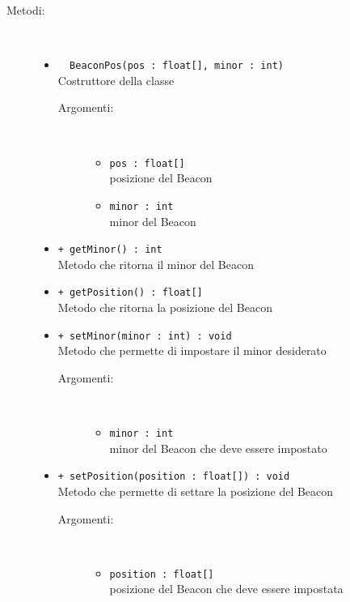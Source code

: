 \documentclass[../DefinizioneDiProdotto.tex]{subfiles}
\begin{document}
\begin{description}
\begin{itemize}
	\end{itemize}
	\item[Metodi:] \
	\begin{itemize}
		\item \texttt{~ BeaconPos(pos : float[], minor : int)}\\
		Costruttore della classe
		\begin{description}
			\item[Argomenti:] \
			\begin{itemize}
				\item \texttt{pos : float[]}\\
				posizione del Beacon\item \texttt{minor : int}\\
				minor del Beacon\end{itemize}
		\end{description}
		\item \texttt{+ getMinor() : int}\\
		Metodo che ritorna il minor del Beacon
		\item \texttt{+ getPosition() : float[]}\\
		Metodo che ritorna la posizione del Beacon
		\item \texttt{+ setMinor(minor : int) : void}\\
		Metodo che permette di impostare il minor desiderato
		\begin{description}
			\item[Argomenti:] \
			\begin{itemize}
				\item \texttt{minor : int}\\
				minor del Beacon che deve essere impostato\end{itemize}
		\end{description}
		\item \texttt{+ setPosition(position : float[]) : void}\\
		Metodo che permette di settare la posizione del Beacon
		\begin{description}
			\item[Argomenti:] \
			\begin{itemize}
				\item \texttt{position : float[]}\\
				posizione del Beacon che deve essere impostata\end{itemize}
		\end{description}
	\end{itemize}
\end{description}
\end{document}
